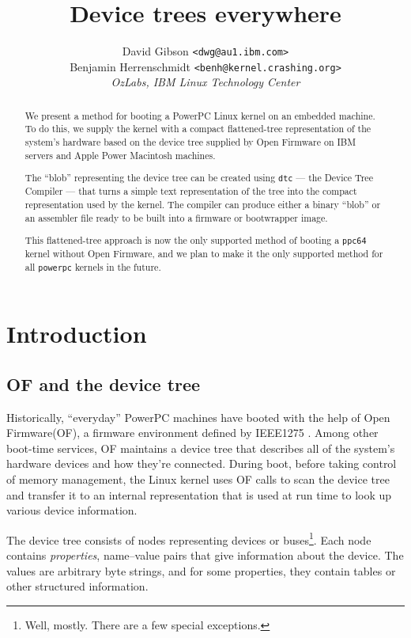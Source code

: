 \documentclass[a4paper,twocolumn]{article}
\title{Device trees everywhere}
\author{David Gibson \texttt{<{dwg}{@}{au1.ibm.com}>}\\
  Benjamin Herrenschmidt \texttt{<{benh}{@}{kernel.crashing.org}>}\\
  \emph{OzLabs, IBM Linux Technology Center}}
\newcommand{\R}{\textsuperscript{\textregistered}\xspace}
\newcommand{\ppc}{\mbox{PowerPC}\xspace}
\newcommand{\of}{Open Firmware\xspace}
\newcommand{\dtc}{\texttt{dtc}\xspace}
\begin{document}
\maketitle

\begin{abstract}
  We present a method for booting a \ppc{}\R Linux\R kernel on an
  embedded machine.  To do this, we supply the kernel with a compact
  flattened-tree representation of the system's hardware based on the
  device tree supplied by Open Firmware on IBM\R servers and Apple\R
  Power Macintosh\R machines.

  The ``blob'' representing the device tree can be created using \dtc
  --- the Device Tree Compiler --- that turns a simple text
  representation of the tree into the compact representation used by
  the kernel.  The compiler can produce either a binary ``blob'' or an
  assembler file ready to be built into a firmware or bootwrapper
  image.

  This flattened-tree approach is now the only supported method of
  booting a \texttt{ppc64} kernel without Open Firmware, and we plan
  to make it the only supported method for all \texttt{powerpc}
  kernels in the future.
\end{abstract}

\section{Introduction}

\subsection{OF and the device tree}

Historically, ``everyday'' \ppc machines have booted with the help of
\of (OF), a firmware environment defined by IEEE1275 \cite{IEEE1275}.
Among other boot-time services, OF maintains a device tree that
describes all of the system's hardware devices and how they're
connected.  During boot, before taking control of memory management,
the Linux kernel uses OF calls to scan the device tree and transfer it
to an internal representation that is used at run time to look up
various device information.

The device tree consists of nodes representing devices or
buses\footnote{Well, mostly.  There are a few special exceptions.}.
Each node contains \emph{properties}, name--value pairs that give
information about the device.  The values are arbitrary byte strings,
and for some properties, they contain tables or other structured
information.
\end{document}
